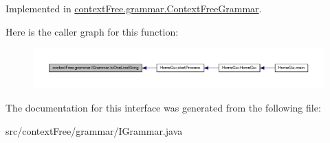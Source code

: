 Implemented in \hyperlink{classcontext_free_1_1grammar_1_1_context_free_grammar_a922203e2db862d2a8ab31e8e7736273b}{context\-Free.\-grammar.\-Context\-Free\-Grammar}.



Here is the caller graph for this function\-:\nopagebreak
\begin{figure}[H]
\begin{center}
\leavevmode
\includegraphics[width=350pt]{interfacecontext_free_1_1grammar_1_1_i_grammar_a5fdeb5a6a9426b400c2fe805566a377c_icgraph}
\end{center}
\end{figure}




The documentation for this interface was generated from the following file\-:\begin{DoxyCompactItemize}
\item 
src/context\-Free/grammar/I\-Grammar.\-java\end{DoxyCompactItemize}
